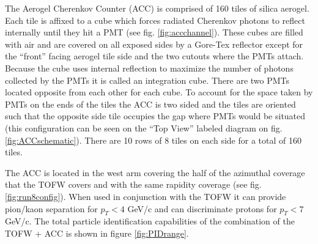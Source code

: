 The Aerogel Cherenkov Counter (ACC) is comprised of 160 tiles of silica aerogel. Each tile is affixed to a cube which forces radiated Cherenkov photons to reflect internally until they hit a PMT (see fig. \ref{fig:accchannel}). These cubes are filled with air and are covered on all exposed sides by a Gore-Tex reflector except for the ``front'' facing aerogel tile side and the two cutouts where the PMTs attach. Because the cube uses internal reflection to maximize the number of photons collected by the PMTs it is called an integration cube. There are two PMTs located opposite from each other for each cube. To account for the space taken by PMTs on the ends of the tiles the ACC is two sided and the tiles are oriented such that the opposite side tile occupies the gap where PMTs would be situated (this configuration can be seen on the ``Top View'' labeled diagram on fig. \ref{fig:ACCschematic}). There are 10 rows of 8 tiles on each side for a total of 160 tiles.

The ACC is located in the west arm covering the half of the azimuthal coverage that the TOFW covers and with the same rapidity coverage (see fig. \ref{fig:run8config}). When used in conjunction with the TOFW it can provide pion/kaon separation for $p_{T} < 4$ GeV/c and can discriminate protons for $p_{T} < 7$ GeV/c.  The total particle identification capabilities of the combination of the TOFW + ACC is shown in figure \ref{fig:PIDrange}.

